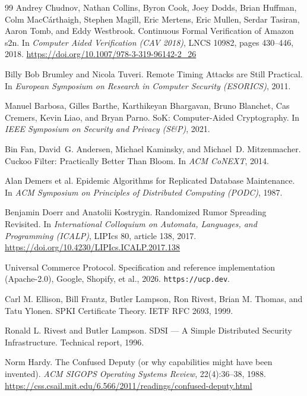 \documentclass[11pt,a4paper]{article}
\theoremstyle{definition}
\begin{document}
\begin{thebibliography}{99}
Andrey Chudnov, Nathan Collins, Byron Cook, Joey Dodds, Brian Huffman, Colm MacC\'arthaigh, Stephen Magill, Eric Mertens, Eric Mullen, Serdar Tasiran, Aaron Tomb, and Eddy Westbrook.
\newblock Continuous Formal Verification of Amazon s2n.
\newblock In \textit{Computer Aided Verification (CAV 2018)}, LNCS 10982, pages 430--446, 2018.
\newblock \url{https://doi.org/10.1007/978-3-319-96142-2_26}

Billy Bob Brumley and Nicola Tuveri.
\newblock Remote Timing Attacks are Still Practical.
\newblock In \textit{European Symposium on Research in Computer Security (ESORICS)}, 2011.

Manuel Barbosa, Gilles Barthe, Karthikeyan Bhargavan, Bruno Blanchet, Cas Cremers, Kevin Liao, and Bryan Parno.
\newblock SoK: Computer-Aided Cryptography.
\newblock In \textit{IEEE Symposium on Security and Privacy (S\&P)}, 2021.

Bin Fan, David~G. Andersen, Michael Kaminsky, and Michael~D. Mitzenmacher.
\newblock Cuckoo Filter: Practically Better Than Bloom.
\newblock In \textit{ACM CoNEXT}, 2014.

Alan Demers et al.
\newblock Epidemic Algorithms for Replicated Database Maintenance.
\newblock In \textit{ACM Symposium on Principles of Distributed Computing (PODC)}, 1987.

Benjamin Doerr and Anatolii Kostrygin.
\newblock Randomized Rumor Spreading Revisited.
\newblock In \textit{International Colloquium on Automata, Languages, and Programming (ICALP)}, LIPIcs 80, article 138, 2017.
\newblock \url{https://doi.org/10.4230/LIPIcs.ICALP.2017.138}

Universal Commerce Protocol.
\newblock Specification and reference implementation (Apache-2.0), Google, Shopify, et al., 2026.
\newblock \texttt{https://ucp.dev}.

Carl M. Ellison, Bill Frantz, Butler Lampson, Ron Rivest, Brian M. Thomas, and Tatu Ylonen.
\newblock SPKI Certificate Theory.
\newblock IETF RFC 2693, 1999.

Ronald L. Rivest and Butler Lampson.
\newblock SDSI --- A Simple Distributed Security Infrastructure.
\newblock Technical report, 1996.

Norm Hardy.
\newblock The Confused Deputy (or why capabilities might have been invented).
\newblock \textit{ACM SIGOPS Operating Systems Review}, 22(4):36--38, 1988.
\newblock \url{https://css.csail.mit.edu/6.566/2011/readings/confused-deputy.html}


\end{thebibliography}
\end{document}
